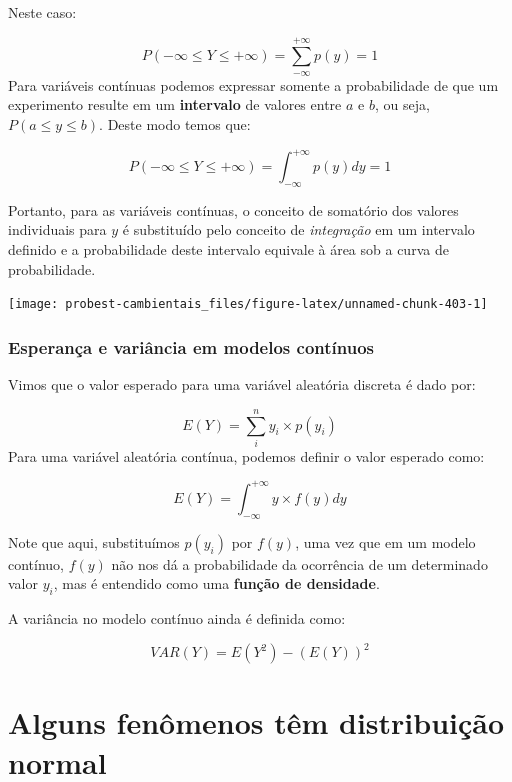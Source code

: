 \documentclass[
]{book}
\begin{document}
Neste caso:

\[P(-\infty \le Y \le +\infty) = \sum_{-\infty}^{+\infty} p(y) = 1\]
Para variáveis contínuas podemos expressar somente a probabilidade de que um experimento resulte em um \textbf{intervalo} de valores entre \(a\) e \(b\), ou seja, \(P(a \le y \le b)\). Deste modo temos que:

\[P(-\infty \le Y \le +\infty) = \int_{-\infty}^{+\infty}p(y) dy = 1\]

Portanto, para as variáveis contínuas, o conceito de somatório dos valores individuais para \(y\) é substituído pelo conceito de \emph{integração} em um intervalo definido e a probabilidade deste intervalo equivale à área sob a curva de probabilidade.

\begin{center}\texttt{[image: probest-cambientais\_files/figure-latex/unnamed-chunk-403-1]} \end{center}

\hypertarget{esperanuxe7a-e-variuxe2ncia-em-modelos-contuxednuos}{%
\subsubsection*{Esperança e variância em modelos contínuos}\label{esperanuxe7a-e-variuxe2ncia-em-modelos-contuxednuos}}

Vimos que o valor esperado para uma variável aleatória discreta é dado por:

\[E(Y) = \sum_i^n y_i \times p(y_i)\]
Para uma variável aleatória contínua, podemos definir o valor esperado como:

\[E(Y) = \int_{-\infty}^{+\infty}y \times f(y) dy\]

Note que aqui, substituímos \(p(y_i)\) por \(f(y)\), uma vez que em um modelo contínuo, \(f(y)\) não nos dá a probabilidade da ocorrência de um determinado valor \(y_i\), mas é entendido como uma \textbf{função de densidade}.

A variância no modelo contínuo ainda é definida como:

\[VAR(Y) = E(Y^2) - (E(Y))^2\]

\hypertarget{alguns-fenuxf4menos-tuxeam-distribuiuxe7uxe3o-normal}{%
\section{Alguns fenômenos têm distribuição normal}\label{alguns-fenuxf4menos-tuxeam-distribuiuxe7uxe3o-normal}}
\end{document}
